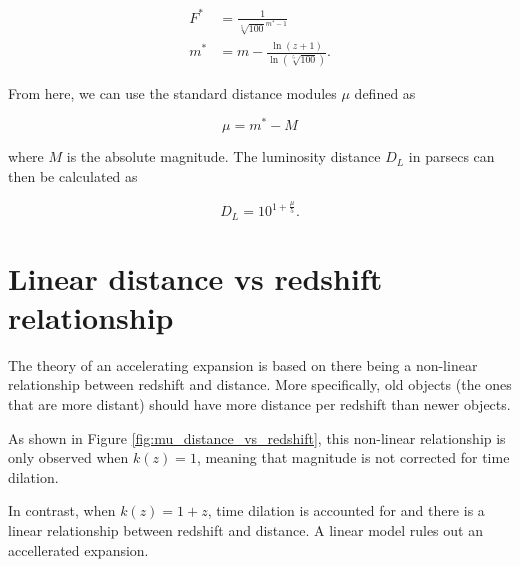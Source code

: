 \documentclass{article}
\begin{document}
\begin{equation}
\begin{aligned}
   F^* &= \frac{1}{\sqrt[5]{100}^{m^* - 1}} \\
   m^* &= m - \frac{\ln{(z + 1)}}{\ln{(\sqrt[5]{100})}}.
\end{aligned}
\end{equation}

From here, we can use the standard distance modules $\mu$ defined as

\begin{equation}
  \mu = m^* - M
\end{equation}

where $M$ is the absolute magnitude. The luminosity distance $D_L$ in parsecs
can then be calculated as

\begin{equation}
  D_L = 10^{1 + \frac{\mu}{5}}.
\end{equation}

\section{Linear distance vs redshift relationship}

The theory of an accelerating expansion is based on there being a non-linear
relationship between redshift and distance. More specifically, old objects (the
ones that are more distant) should have more distance per redshift than newer
objects.

As shown in Figure \ref{fig:mu_distance_vs_redshift}, this non-linear
relationship is only observed when $k(z) = 1$, meaning that magnitude is not
corrected for time dilation.

In contrast, when $k(z) = 1 + z$, time dilation is accounted for and there is a
linear relationship between redshift and distance. A linear model rules out an
accellerated expansion.
\end{document}
